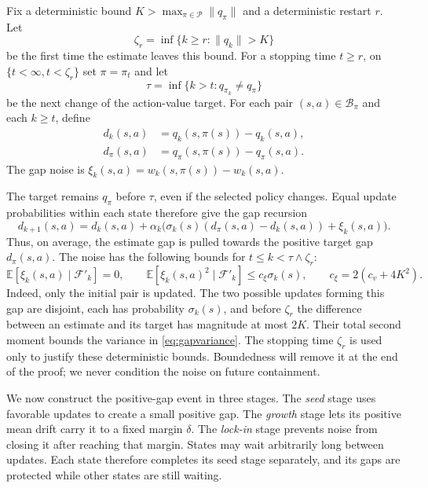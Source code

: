 \begin{definition}
\label{def: gap variables}
Fix a deterministic bound $K>\max_{\pi\in\mathcal P}\|q_\pi\|$ and a deterministic restart $r$. Let
\[
\zeta_r=\inf\{k\ge r:\|q_k\|>K\}
\]
be the first time the estimate leaves this bound.
For a stopping time $t\ge r$, on $\{t<\infty,t<\zeta_r\}$ set $\pi=\pi_t$ and let
\[
\tau=\inf\{k>t:q_{\pi_k}\ne q_\pi\}
\]
be the next change of the action-value target.
For each pair $(s,a)\in\mathcal B_\pi$ and each $k\ge t$, define
\begin{align}
\label{eq:gaps}
d_k(s,a)&=q_k(s,\pi(s))-q_k(s,a),\\
d_\pi(s,a)&=q_\pi(s,\pi(s))-q_\pi(s,a).
\end{align}
The gap noise is $\xi_k(s,a)=w_k(s,\pi(s))-w_k(s,a)$.
\end{definition}

The target remains $q_\pi$ before $\tau$, even if the selected policy changes. Equal update probabilities within each state therefore give the gap recursion
\begin{equation}
\label{eq:gapdrift}
d_{k+1}(s,a)=d_k(s,a)+\alpha_k\big(\sigma_k(s)(d_\pi(s,a)-d_k(s,a))+\xi_k(s,a)\big).
\end{equation}
Thus, on average, the estimate gap is pulled towards the positive target gap $d_\pi(s,a)$. The noise has the following bounds for $t\le k<\tau\wedge\zeta_r$:
\begin{equation}
\label{eq:gapvariance}
\mathbb E[\xi_k(s,a)\mid\mathcal F'_k]=0,
\qquad
\mathbb E[\xi_k(s,a)^2\mid\mathcal F'_k]\le c_\xi\sigma_k(s),
\qquad c_\xi=2(c_v+4K^2).
\end{equation}
Indeed, only the initial pair is updated. The two possible updates forming this gap are disjoint, each has probability $\sigma_k(s)$, and before $\zeta_r$ the difference between an estimate and its target has magnitude at most $2K$. Their total second moment bounds the variance in \eqref{eq:gapvariance}.
The stopping time $\zeta_r$ is used only to justify these deterministic bounds. Boundedness will remove it at the end of the proof; we never condition the noise on future containment.

We now construct the positive-gap event in three stages. The \emph{seed} stage uses favorable updates to create a small positive gap. The \emph{growth} stage lets its positive mean drift carry it to a fixed margin $\delta$. The \emph{lock-in} stage prevents noise from closing it after reaching that margin. States may wait arbitrarily long between updates. Each state therefore completes its seed stage separately, and its gaps are protected while other states are still waiting.

